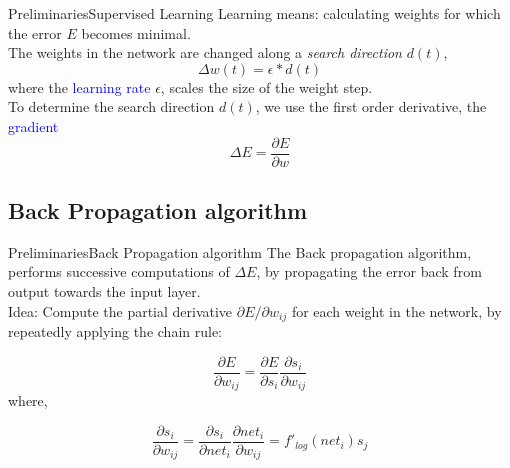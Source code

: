 \documentclass{beamer}
\begin{document}
\begin{frame}{Preliminaries}{Supervised Learning}
Learning means: calculating weights for which the error $ E $ becomes minimal. \\ 

\vspace{3mm}
The weights in the network are changed along a \textit{search direction }$ d(t) $,
\begin{equation*}
\Delta w(t) = \epsilon * d(t)
\end{equation*}
where the \textcolor{blue}{learning rate} $ \epsilon $, scales the size of the weight step. \\ 

\vspace{3mm}
To determine the search direction $ d(t) $, we use the first order derivative, the \textcolor{blue}{gradient}  
\[ \Delta E = \frac{ \partial E }{\partial w} \]  
\end{frame}


\subsection{Back Propagation algorithm}
\begin{frame}{Preliminaries}{Back Propagation algorithm}
The Back propagation algorithm, performs successive computations of $ \Delta E $, by propagating the error back from output towards the input layer.   	\\

\pause
Idea: Compute the partial derivative $ \partial E / \partial w_{ij} $ for each weight in the network, by repeatedly applying the chain rule: 

\begin{equation*}
\frac{\partial E}{\partial w_{ij}} = \frac{\partial E}{\partial s_{i}} \frac{\partial s_i}{\partial w_{ij}}
\end{equation*}
where,

\begin{equation*}
\frac{\partial s_i}{\partial w_{ij}} = \frac{\partial s_i}{\partial{net_{i}}} \frac{\partial {net_i}}{\partial w_{ij}} = f'_{log} (net_i) s_j
\end{equation*}	


\end{frame}
\end{document}
